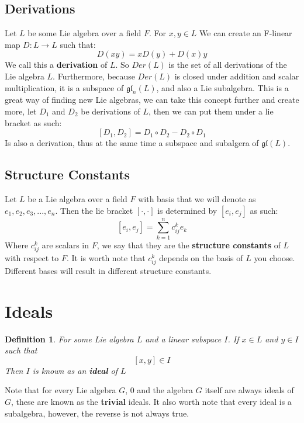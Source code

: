 \documentclass[12pt, letterpaper]{article}
\newtheorem*{defn}{Definition}
\begin{document}
\subsection{Derivations}
Let $L$ be some Lie algebra over a field $F$. For $x,y \in L$ We can create an F-linear map $D: L \rightarrow L$ such that:
\[ D(xy) = xD(y) + D(x)y \]
We call this a \textbf{derivation} of $L$. So $Der(L)$ is the set of all derivations of the Lie algebra $L$. Furthermore, because $Der(L)$ is closed under addition and scalar multiplication, it is a subspace of $\mathfrak{gl}_n(L)$, and also a Lie subalgebra. This is a great way of finding new Lie algebras, we can take this concept further and create more, let $D_1$ and $D_2$ be derivations of $L$, then we can put them under a lie bracket as such:
\[ [D_1, D_2] = D_1 \circ D_2 - D_2 \circ D_1 \]
Is also a derivation, thus at the same time a subspace and subalgera of $\mathfrak{gl}(L)$.


\subsection{Structure Constants}
Let $L$ be a Lie algebra over a field $F$ with basis that we will denote as ${e_1, e_2, e_3, ..., e_n}$. Then the lie bracket $[\cdot, \cdot]$ is determined by $[e_i, e_j]$ as such:
\[ [e_i,e_j] = \sum	^{n}_{k=1} c^k_{ij}e_k \]
Where $c^k_{ij}$ are scalars in $F$, we say that they are the \textbf{structure constants} of $L$ with respect to $F$. It is worth note that $c^k_{ij}$ depends on the basis of $ L$ you choose. Different bases will result in different structure constants.



\section{Ideals}
\begin{defn}
For some Lie algebra $L$ and a linear subspace $I$. If $x \in L$ and $y \in I$ such that
\[ [x,y]\in I \]
Then $I$ is known as an \textbf{ideal} of $L$
\end{defn}

Note that for every Lie algebra $G$, 0 and the algebra $G$ itself are always ideals of $G$, these are known as the \textbf{trivial} ideals. It also worth note that every ideal is a subalgebra, however, the reverse is not always true.
\end{document}
